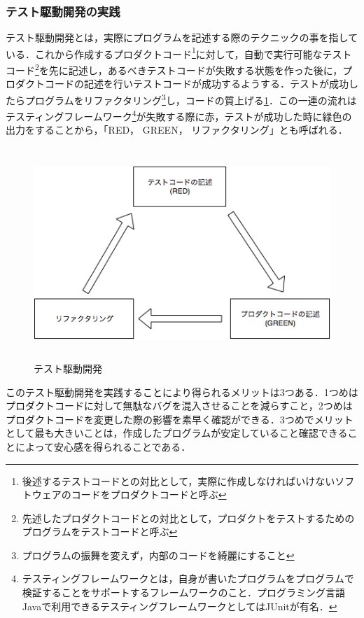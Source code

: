 \subsubsection{テスト駆動開発の実践}

テスト駆動開発とは，実際にプログラムを記述する際のテクニックの事を指している．これから作成するプロダクトコード\footnote{後述するテストコードとの対比として，実際に作成しなければいけないソフトウェアのコードをプロダクトコードと呼ぶ}に対して，自動で実行可能なテストコード\footnote{先述したプロダクトコードとの対比として，プロダクトをテストするためのプログラムをテストコードと呼ぶ}を先に記述し，あるべきテストコードが失敗する状態を作った後に，プロダクトコードの記述を行いテストコードが成功するようする．テストが成功したらプログラムをリファクタリング\footnote{プログラムの振舞を変えず，内部のコードを綺麗にすること}し，コードの質上げる\ref{fig:tdd}．この一連の流れはテスティングフレームワーク\footnote{テスティングフレームワークとは，自身が書いたプログラムをプログラムで検証することをサポートするフレームワークのこと．プログラミング言語Javaで利用できるテスティングフレームワークとしてはJUnitが有名．}が失敗する際に赤，テストが成功した時に緑色の出力をすることから，「RED， GREEN， リファクタリング」とも呼ばれる．

\begin{figure}[H]
\centering
\includegraphics[height=8cm]{./assets/images/tdd.png}
\caption{テスト駆動開発}
\label{fig:tdd}
\end{figure}


このテスト駆動開発を実践することにより得られるメリットは3つある．1つめはプロダクトコードに対して無駄なバグを混入させることを減らすこと，2つめはプロダクトコードを変更した際の影響を素早く確認ができる．3つめでメリットとして最も大きいことは，作成したプログラムが安定していること確認できることによって安心感を得られることである．

